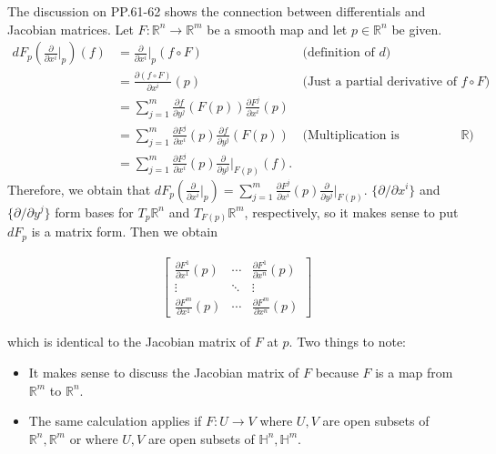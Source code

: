 \begin{rem}\label{jacobian_differentials}
  The discussion on PP.61-62 shows the connection between differentials and Jacobian matrices.
  Let $F: \mathbb{R}^n \rightarrow \mathbb{R}^m$ be a smooth map and let $p \in \mathbb{R}^n$ be given.
  \begin{align}
    dF_p(\frac{\partial}{\partial x^i}\Big\vert_p)(f) 
      &= \frac{\partial}{\partial x^i}\Big\vert_p(f \circ F) & \text{(definition of $d$)} \\
      &= \frac{\partial (f \circ F)}{\partial x^i}(p) & \text{(Just a partial derivative of $f \circ F$)} \\
      &= \sum_{j=1}^{m} \frac{\partial f}{\partial y^j}(F(p))\frac{\partial F^j}{\partial x^i}(p) \\
      &= \sum_{j=1}^{m} \frac{\partial F^j}{\partial x^i}(p)\frac{\partial f}{\partial y^j}(F(p)) & \text{(Multiplication is commutative in $\mathbb{R}$)} \\
      &= \sum_{j=1}^{m} \frac{\partial F^j}{\partial x^i}(p)\frac{\partial}{\partial y^j}\Big\vert_{F(p)}(f).
  \end{align}
  Therefore, we obtain that $dF_p(\frac{\partial}{\partial x^i}\big\vert_p) = \sum_{j=1}^{m} \frac{\partial F^j}{\partial x^i}(p)\frac{\partial}{\partial y^j}\big\vert_{F(p)}$.
  $\{ \partial / \partial x^i \}$ and $\{ \partial / \partial y^j \}$ form bases for $T_p\mathbb{R}^n$ and $T_{F(p)}\mathbb{R}^m$, respectively, so it makes sense to put $dF_p$ is a matrix form.
  Then we obtain

  \begin{align*}
    \begin{bmatrix}
      \frac{\partial F^1}{\partial x^1}(p) & \cdots & \frac{\partial F^1}{\partial x^n}(p) \\
      \vdots & \ddots & \vdots \\
      \frac{\partial F^m}{\partial x^1}(p) & \cdots & \frac{\partial F^m}{\partial x^n}(p)
    \end{bmatrix}
  \end{align*}

  which is identical to the Jacobian matrix of $F$ at $p$.
  Two things to note:
  \begin{itemize}
    \item
      It makes sense to discuss the Jacobian matrix of $F$ because $F$ is a map from $\mathbb{R}^m$ to $\mathbb{R}^n$.
    \item
      The same calculation applies if $F: U \rightarrow V$ where $U, V$ are open subsets of $\mathbb{R}^n, \mathbb{R}^m$ or where $U, V$ are open subsets of $\mathbb{H}^n, \mathbb{H}^m$.
  \end{itemize}


\end{rem}
